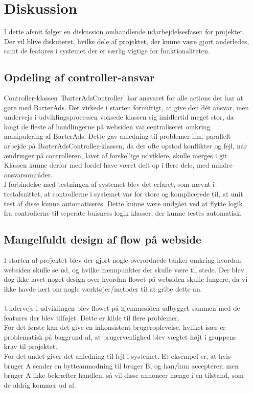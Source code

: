 \chapter{Diskussion}
I dette afsnit følger en diskussion omhandlende udarbejdelsesfasen for projektet. Der vil blive diskuteret, hvilke dele af projektet, der kunne være gjort anderledes, samt de features i systemet der er særlig vigtige for funktionaliteten.

\section{Opdeling af controller-ansvar}
Controller-klassen 'BarterAdsController' har ansvaret for alle actions der har at gøre med BarterAds. Det virkede i starten fornuftigt, at give den dét ansvar, men undervejs i udviklingsprocessen voksede klassen sig imidlertid meget stor, da langt de fleste af handlingerne på websiden var centraliseret omkring manipulering af BarterAds. Dette gav anledning til problemer ifm. parallelt arbejde på BarterAdsController-klassen, da der ofte opstod konflikter og fejl, når ændringer på controlleren, lavet af forskellige udviklere, skulle merges i git. Klassen kunne derfor med fordel have været delt op i flere dele, med mindre ansvarsområder. \\
I forbindelse med testningen af systemet blev det erfaret, som nævnt i testafsnittet, at controllerne i systemet var for store og komplicerede til, at unit test af disse kunne automatiseres. Dette kunne være undgået ved at flytte logik fra controllerne til seperate buisness logik klasser, der kunne testes automatisk.

\section{Mangelfuldt design af flow på webside}
I starten af projektet blev der gjort nogle overordnede tanker omkring hvordan websiden skulle se ud, og hvilke menupunkter der skulle være til stede. Der blev dog ikke lavet noget design over hvordan flowet på websiden skulle fungere, da vi ikke havde lært om nogle værktøjer/metoder til at gribe dette an. \\ \\
Undervejs i udviklingen blev flowet på hjemmesiden udbygget sammen med de features der blev tilføjet. Dette er kilde til flere problemer. \\
For det første kan det give en inkonsistent brugeroplevelse, hvilket især er problematisk på baggrund af, at brugervenlighed blev vægtet højt i gruppens krav til projektet. \\
For det andet giver det anledning til fejl i systemet. Et eksempel er, at hvis bruger A sender en bytteanmodning til bruger B, og han/hun accepterer, men bruger A ikke bekræfter handlen, så vil disse annoncer hænge i en tilstand, som de aldrig kommer ud af.\\

